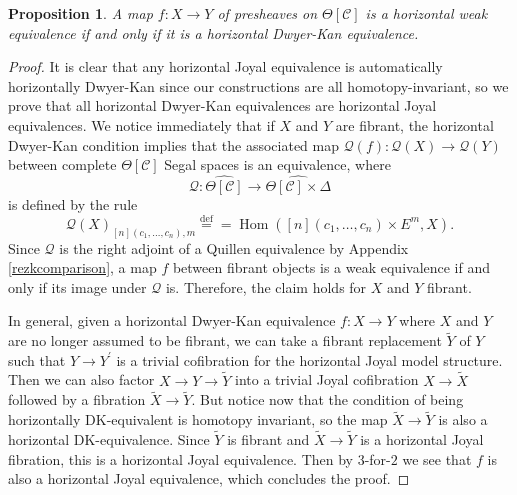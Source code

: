\documentclass{amsart}
\numberwithin{equation}{section}
\theoremstyle{plain}   %
\newtheorem{prop}[subsection]{Proposition}
\theoremstyle{remark}
\theoremstyle{plain}
\DeclareMathOperator{\Hom}{Hom}
\newcommand{\psh}[1]{\ensuremath{\widehat{#1}}}
\newcommand{\C}{\ensuremath{\mathcal{C}}}
\newcommand{\defeq}{\overset{\mathrm{def}}=}
\newcommand{\cellset}{\ensuremath{\widehat{\Theta[\mathcal{C}]}}}
\begin{document}
\begin{prop} A map \(f:X\to Y\) of presheaves on \(\Theta[\C]\) is a horizontal weak equivalence if and only if it is a horizontal Dwyer-Kan equivalence.
\end{prop}
\begin{proof}
	It is clear that any horizontal Joyal equivalence is automatically horizontally Dwyer-Kan since our constructions are all homotopy-invariant, so we prove that all horizontal Dwyer-Kan equivalences are horizontal Joyal equivalences.  We notice immediately that if \(X\) and \(Y\) are fibrant, the horizontal Dwyer-Kan condition implies that the associated map \(\mathcal{Q}(f):\mathcal{Q}(X)\to \mathcal{Q}(Y)\) between complete \(\Theta[\C]\) Segal spaces is an equivalence, where
	\[\mathcal{Q}:\cellset \to \psh{\Theta[\C]\times \Delta}\]
	is defined by the rule
	\[\mathcal{Q}(X)_{[n](c_1,\dots,c_n),m} \defeq=\Hom([n](c_1,\dots,c_n)\times E^m,X).\]
	Since \(\mathcal{Q}\) is the right adjoint of a Quillen equivalence by Appendix \ref{rezkcomparison}, a map \(f\) between fibrant objects is a weak equivalence if and only if its image under \(\mathcal{Q}\) is.  Therefore, the claim holds for \(X\) and \(Y\) fibrant.

	In general, given a horizontal Dwyer-Kan equivalence \(f:X\to Y\) where \(X\) and \(Y\) are no longer assumed to be fibrant, we can take a fibrant replacement \(\tilde{Y}\) of \(Y\) such that \(Y\to Y^\prime\) is a trivial cofibration for the horizontal Joyal model structure.  Then we can also factor \(X\to Y\to \tilde{Y}\) into a trivial Joyal cofibration \(X\to \tilde{X}\) followed by a fibration \(\tilde{X}\to \tilde{Y}\).  But notice now that the condition of being horizontally DK-equivalent is homotopy invariant, so the map \(\tilde{X}\to \tilde{Y}\) is also a horizontal DK-equivalence.  Since \(\tilde{Y}\) is fibrant and \(\tilde{X}\to \tilde{Y}\) is a horizontal Joyal fibration, this is a horizontal Joyal equivalence.  Then by \(3\)-for-\(2\)  we see that \(f\) is also a horizontal Joyal equivalence, which concludes the proof.
\end{proof}
\end{document}
